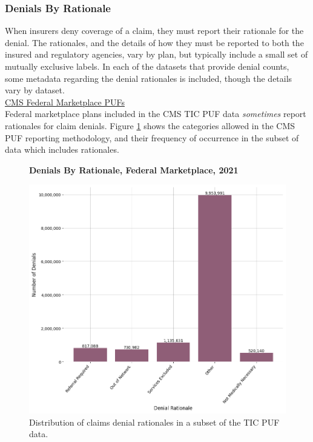\documentclass[12pt, a4paper,twoside]{report}
\theoremstyle{plain} %
\theoremstyle{definition} %
\theoremstyle{remark} %
\numberwithin{equation}{chapter}
\begin{document}
		
		\subsubsection{Denials By Rationale}
		
		When insurers deny coverage of a claim, they must report their rationale for the denial. The rationales, and the details of how they must be reported to both the insured and regulatory agencies, vary by plan, but typically include a small set of mutually exclusive labels. In each of the datasets that provide denial counts, some metadata regarding the denial rationales is included, though the details vary by dataset.\\
		
		\underline{CMS Federal Marketplace PUFs}\\
		
		Federal marketplace plans included in the CMS TIC PUF data \emph{sometimes} report rationales for claim denials. Figure \ref{federalrationaledist} shows the categories allowed in the CMS PUF reporting methodology, and their frequency of occurrence in the subset of data which includes rationales.\\
		
		\begin{figure}[h!]
			\centering
			\textbf{Denials By Rationale, Federal Marketplace, 2021}\par\medskip
			\includegraphics[width=\columnwidth]{images/cms_puf/denials_by_rationale.png}
			\caption{Distribution of claims denial rationales in a subset of the TIC PUF data. }
			\label{federalrationaledist}
		\end{figure}
\end{document}
